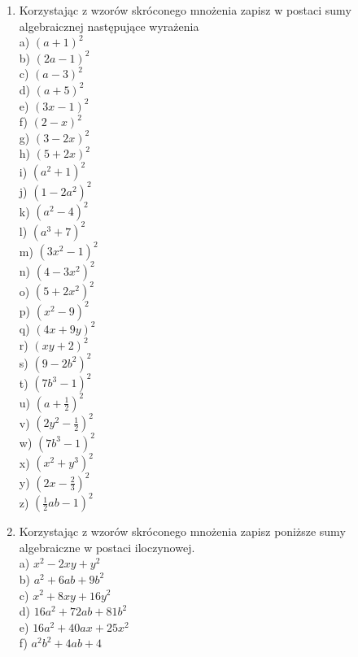 \documentclass[10pt]{article}
\begin{document}
\begin{enumerate}
  \item Korzystając z wzorów skróconego mnożenia zapisz w postaci sumy algebraicznej następujące wyrażenia\\
a) \((a+1)^{2}\)\\
b) \((2 a-1)^{2}\)\\
c) \((a-3)^{2}\)\\
d) \((a+5)^{2}\)\\
e) \((3 x-1)^{2}\)\\
f) \((2-x)^{2}\)\\
g) \((3-2 x)^{2}\)\\
h) \((5+2 x)^{2}\)\\
i) \(\left(a^{2}+1\right)^{2}\)\\
j) \(\left(1-2 a^{2}\right)^{2}\)\\
k) \(\left(a^{2}-4\right)^{2}\)\\
l) \(\left(a^{3}+7\right)^{2}\)\\
m) \(\left(3 x^{2}-1\right)^{2}\)\\
n) \(\left(4-3 x^{2}\right)^{2}\)\\
o) \(\left(5+2 x^{2}\right)^{2}\)\\
p) \(\left(x^{2}-9\right)^{2}\)\\
q) \((4 x+9 y)^{2}\)\\
r) \((x y+2)^{2}\)\\
s) \(\left(9-2 b^{2}\right)^{2}\)\\
t) \(\left(7 b^{3}-1\right)^{2}\)\\
u) \(\left(a+\frac{1}{2}\right)^{2}\)\\
v) \(\left(2 y^{2}-\frac{1}{2}\right)^{2}\)\\
w) \(\left(7 b^{3}-1\right)^{2}\)\\
x) \(\left(x^{2}+y^{3}\right)^{2}\)\\
y) \(\left(2 x-\frac{2}{3}\right)^{2}\)\\
z) \(\left(\frac{1}{2} a b-1\right)^{2}\)
  \item Korzystając z wzorów skróconego mnożenia zapisz poniższe sumy algebraiczne w postaci iloczynowej.\\
a) \(x^{2}-2 x y+y^{2}\)\\
b) \(a^{2}+6 a b+9 b^{2}\)\\
c) \(x^{2}+8 x y+16 y^{2}\)\\
d) \(16 a^{2}+72 a b+81 b^{2}\)\\
e) \(16 a^{2}+40 a x+25 x^{2}\)\\
f) \(a^{2} b^{2}+4 a b+4\)\\

\end{enumerate}
\end{document}
